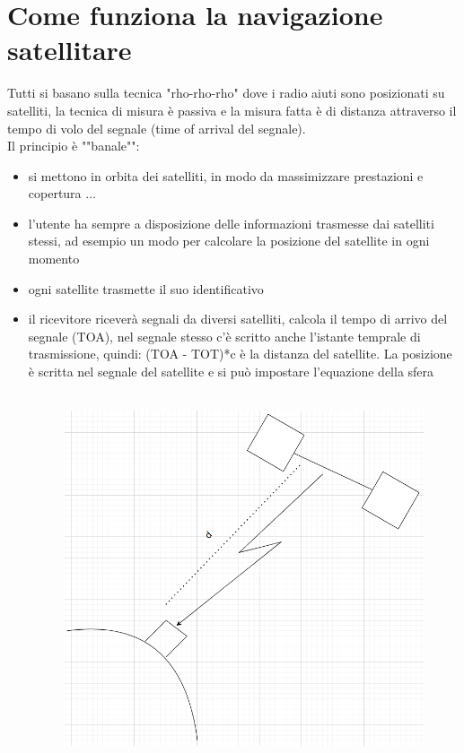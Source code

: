 \documentclass[oneside, 12pt]{extbook}
\begin{document}
\section{Come funziona la navigazione satellitare}
Tutti si basano sulla tecnica "rho-rho-rho" dove i radio aiuti sono posizionati su satelliti, la tecnica di misura è passiva e la misura fatta è di distanza attraverso il tempo di volo del segnale (time of arrival del segnale).\\
Il principio è ""banale"":
\begin{itemize}
	\item si mettono in orbita dei satelliti, in modo da massimizzare prestazioni e copertura ...
	\item l'utente ha sempre a disposizione delle informazioni trasmesse dai satelliti stessi, ad esempio un modo per calcolare la posizione del satellite in ogni momento
	\item ogni satellite trasmette il suo identificativo
	\item il ricevitore riceverà segnali da diversi satelliti, calcola il tempo di arrivo del segnale (TOA), nel segnale stesso c'è scritto anche l'istante temprale di trasmissione, quindi: (TOA - TOT)*c è la distanza del satellite. La posizione è scritta nel segnale del satellite e si può impostare l'equazione della sfera
	\\\\
	\begin{figure}[!h]
		\includegraphics[scale=0.3]{immagini/localization/satellite_tx.png}

\end{figure}
\end{itemize}
\end{document}
